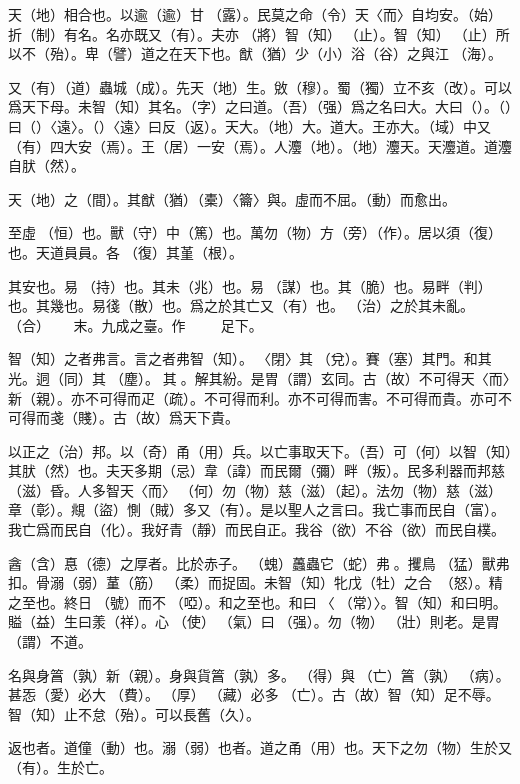 \documentclass[a4paper]{ctexart}
\begin{document}
    天（地）相合也。以逾（逾）甘𩂣（露）。民莫之命（令）天〈而〉自均安。（始）折（制）有名。名亦既又（有）。夫亦𨟻（將）智（知）𣥕（止）。智（知）𣥕（止）所以不（殆）。卑（譬）道之在天下也。猷（猶）少（小）浴（谷）之與江𣳠（海）。

    又（有）（道）蟲城（成）。先天（地）生。敓（穆）。蜀（獨）立不亥（改）。可以爲天下母。未智（知）其名。（字）之曰道。（吾）（强）爲之名曰大。大曰（）。（）曰（）〈遠〉。（）〈遠〉曰反（返）。天大。（地）大。道大。王亦大。（域）中又（有）四大安（焉）。王（居）一安（焉）。人灋（地）。（地）灋天。天灋道。道灋自肰（然）。

    天（地）之（間）。其猷（猶）（橐）〈籥〉與。虛而不屈。（動）而愈出。

    至虛𠄨（恒）也。獸（守）中（篤）也。萬勿（物）方（旁）（作）。居以須（復）也。天道員員。各󵯿（復）其堇（根）。

    其安也。易𣏔（持）也。其未（兆）也。易𢘃（謀）也。其（脆）也。易畔（判）也。其幾也。易㣤（散）也。爲之於其亡又（有）也。𥿆（治）之於其未亂。𣌭（合）☐☐☐☐☐☐末。九成之臺。作☐☐☐☐☐☐☐☐☐足下。

    智（知）之者弗言。言之者弗智（知）。𨳮〈閉〉其𨓚（兌）。賽（塞）其門。和其光。迵（同）其󶴤（塵）。󶴤其󶩴。解其紛。是胃（謂）玄同。古（故）不可得天〈而〉新（親）。亦不可得而疋（疏）。不可得而利。亦不可得而害。不可得而貴。亦可不可得而戔（賤）。古（故）爲天下貴。

    以正之（治）邦。以（奇）甬（用）兵。以亡事取天下。（吾）可（何）以智（知）其肰（然）也。夫天多期（忌）韋（諱）而民爾（彌）畔（叛）。民多利器而邦慈（滋）昏。人多智天〈而〉𢦪（何）勿（物）慈（滋）（起）。法勿（物）慈（滋）章（彰）。覜（盜）惻（賊）多又（有）。是以聖人之言曰。我亡事而民自（富）。我亡爲而民自（化）。我好青（靜）而民自正。我谷（欲）不谷（欲）而民自樸。

    酓（含）惪（德）之厚者。比於赤子。󶵎（螝）䘍蟲它（蛇）弗𧍷。攫鳥󶵏（猛）獸弗扣。骨溺（弱）蓳（筋）󶵐（柔）而捉固。未智（知）牝戊（牡）之合󶵑󶵒（怒）。精之至也。終日󶴋（號）而不𪬐（啞）。和之至也。和曰󶵓〈󼲗（常）〉。智（知）和曰明。賹（益）生曰羕（祥）。心󶴎（使）󶴓（氣）曰󶴔（强）。勿（物）𡒉（壯）則老。是胃（謂）不道。

    名與身䈞（孰）新（親）。身與貨䈞（孰）多。󰴼（得）與󶵔（亡）䈞（孰）󶓄（病）。甚㤅（愛）必大󶵖（費）。󶵗（厚）󶤖（藏）必多󶵔（亡）。古（故）智（知）足不辱。智（知）止不怠（殆）。可以長舊（久）。

    返也者。道僮（動）也。溺（弱）也者。道之甬（用）也。天下之勿（物）生於又（有）。生於亡。

    𣏔（持）而浧（盈）之。不不若已。湍而群之。不可長保也。金玉浧（盈）室。莫能獸（守）也。貴（富）喬（驕）。自遺咎也。攻（功）述（遂）身退。天之道也。
\end{document}
